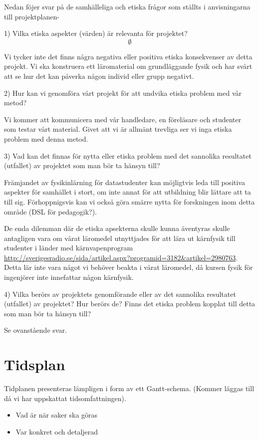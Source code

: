 \documentclass[12pt,a4paper]{scrartcl}
\begin{document}
Nedan föjer svar på de samhälleliga och etiska frågor som ställts i anvisningarna till projektplanen-

1) Vilka etiska  aspekter (värden) är relevanta för projektet?
\[
\emptyset
\]

Vi tycker inte det finns några negativa eller positiva etiska konsekvenser av detta projekt. Vi ska konstruera ett läromaterial om grundläggande fysik och har svårt att se hur det kan påverka någon individ eller grupp negativt.

2) Hur kan vi genomföra vårt projekt för att undvika etiska problem med vår metod? 

Vi kommer att kommunicera med vår handledare, en föreläsare och studenter som testar vårt material. Givet att vi är allmänt trevliga ser vi inga etiska problem med denna metod.

3) Vad kan det finnas för nytta eller etiska problem med det sannolika resultatet (utfallet) av projektet som man bör ta hänsyn till? 

Främjandet av fysikinlärning för datastudenter kan möjligtvis leda till positiva aspekter för samhället i stort, om inte annat för att utbildning blir lättare att ta till sig. Förhoppnigsvis kan vi också göra smärre nytta för forskningen inom detta område (DSL för pedagogik?).

De enda dilemman där de etiska apsekterna skulle kunna äventyras skulle antagligen vara om vårat läromedel utnyttjades för att lära ut kärnfysik till studenter i länder med kärnvapenprogram \url{http://sverigesradio.se/sida/artikel.aspx?programid=3182&artikel=2980763}.
   Detta lär inte vara något vi behöver beakta i vårat läromedel, då kursen fysik för ingenjörer inte innefattar någon kärnfysik.

4)  Vilka berörs av projektets genomförande eller av det sannolika resultatet (utfallet) av projektet? Hur berörs de? Finns det etiska problem kopplat till detta som man bör ta hänsyn till? 

Se ovanstående svar.

\section{Tidsplan}

Tidplanen presenteras lämpligen i form av ett Gantt-schema.
(Kommer läggas till då vi har uppskattat tidsomfattningen).

\begin{itemize}
    \item Vad är när saker ska göras
    \item Var konkret och detaljerad
\end{itemize}
\end{document}
